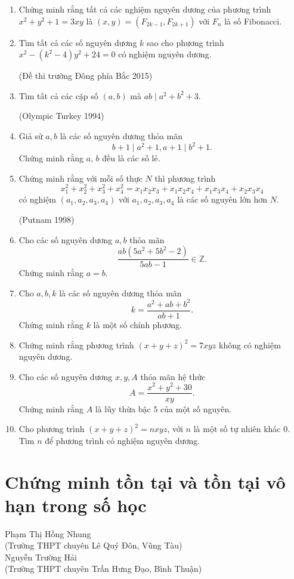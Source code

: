 \begin{enumerate}[1.]
	\item Chứng minh rằng tất cả các nghiệm nguyên dương của phương trình $x^2+y^2+1=3xy$ là $(x,y)=(F_{2k-1},F_{2k+1})$ với $F_n$ là số Fibonacci.
	\item Tìm tất cả các số nguyên dương $k$ sao cho phương trình $x^2-(k^2-4)y^2+24=0$ có nghiệm nguyên dương.
	\begin{flushright}
		(Đề thi trường Đông phía Bắc 2015)
	\end{flushright}
	\item Tìm tất cả các cặp số $(a,b)$ mà $ab\mid a^2+b^2+3.$
	\begin{flushright}
		(Olympic Turkey 1994)
	\end{flushright}
	\item Giả sử $a,b$ là các số nguyên dương thỏa mãn
	\[b+1\mid a^2+1, a+1\mid b^2+1. \]
	Chứng minh rằng $a$, $b$ đều là các số lẻ.
	\item Chứng minh rằng với mỗi số thực $N$ thì phương trình
	\[x_1^2+x_2^2+x_3^2+x_4^2=x_1x_2x_3+x_1x_2x_4+x_1x_3x_4+x_2x_3x_4 \]
	có nghiệm $(a_1,a_2,a_3,a_4)$ với $a_1,a_2,a_3,a_4$ là các số nguyên lớn hơn $N$.
	\begin{flushright}
		(Putnam 1998)
	\end{flushright}
	\item Cho các số nguyên dương $a,b$ thỏa mãn 
	\[ \dfrac{ab(5a^2+5b^2-2)}{5ab-1}\in\mathbb{Z}. \]
	Chứng minh rằng $a=b$.
	\item Cho $a,b,k$ là các số nguyên dương thỏa mãn
	\[k=\dfrac{a^2+ab+b^2}{ab+1}. \]
	Chứng minh rằng $k$ là một số chính phương.
	\item Chứng minh rằng phương trình $(x+y+z)^2=7xyz$ không có nghiệm nguyên dương.
	\item Cho các số nguyên dương $x,y,A$ thỏa mãn hệ thức
	\[ A=\dfrac{x^2+y^2+30}{xy}. \]
	Chứng minh rằng $A$ là lũy thừa bậc $5$ của một số nguyên.
	\item Cho phương trình $(x+y+z)^2=nxyz$, với $n$ là một số tự nhiên khác $0$. Tìm $n$ để phương trình có nghiệm nguyên dương.
\end{enumerate}




\section{Chứng minh tồn tại và tồn tại vô hạn trong số học}

\begin{center}
	Phạm Thị Hồng Nhung \\
	(Trường THPT chuyên Lê Quý Đôn, Vũng Tàu)\\
	Nguyễn Trường Hải\\
	(Trường THPT chuyên Trần Hưng Đạo, Bình Thuận)
\end{center}


